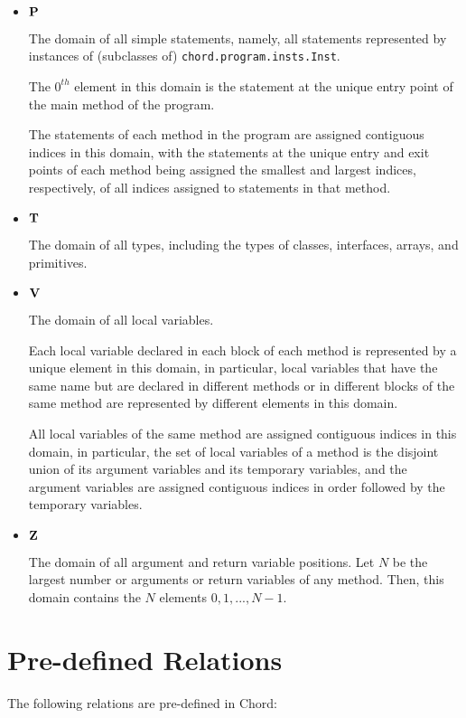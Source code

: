 \documentclass{article}
\providecommand\Vdom{{\bf V}}
\providecommand\Zdom{{\bf Z}}
\providecommand\Tdom{{\bf T}}
\providecommand\Pdom{{\bf P}}
\providecommand\Chord{{Chord}}
\begin{document}
\begin{itemize}
\item
$\Pdom$

The domain of all simple statements, namely, all statements
represented by instances of (subclasses of) {\tt chord.program.insts.Inst}.

The $0^{th}$ element in this domain is the statement at the unique
entry point of the main method of the program.

The statements of each method in the program are assigned
contiguous indices in this domain, with the statements at the
unique entry and exit points of each method being assigned
the smallest and largest indices, respectively, of all
indices assigned to statements in that method.

\item
$\Tdom$

The domain of all types, including the types of classes, interfaces,
arrays, and primitives.

\item
$\Vdom$

The domain of all local variables.

Each local variable declared in each block of each method is
represented by a unique element in this domain, in particular,
local variables that have the same name but are declared in
different methods or in different blocks of the same method
are represented by different elements in this domain.

All local variables of the same method are assigned contiguous
indices in this domain, in particular, the set of local
variables of a method is the disjoint union of its argument
variables and its temporary variables, and the argument
variables are assigned contiguous indices in order followed by
the temporary variables.

\item
$\Zdom$

The domain of all argument and return variable positions.
Let $N$ be the largest number or arguments or return variables of any
method.  Then, this domain contains the $N$ elements $0, 1, ..., N-1$.
\end{itemize}

\texonly{\newpage}
\section{Pre-defined Relations}
\label{sec-predef-relations}

The following relations are pre-defined in \Chord:
\end{document}
